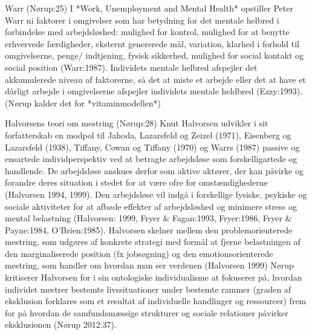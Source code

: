 Warr (Nørup:25)
I *Work, Unemployment and Mental Health* opstiller Peter Warr ni faktorer i omgivelser som har betydning for det mentale helbred i forbindelse med arbejdsløshed: mulighed for kontrol, mulighed for at benytte erhvervede færdigheder, eksternt genererede mål, variation, klarhed i forhold til omgivelserne, penge/ indtjening, fysisk sikkerhed, mulighed for social kontakt og social position (Warr:1987). Individets mentale helbred afspejler det akkumulerede niveau af faktorerne, så det at miste et arbejde eller det at have et dårligt arbejde i omgivelserne afspejler individets mentale heldbred (Ezzy:1993). (Nørup kalder det for *vitaminmodellen*)

Halvorsens teori om mestring (Nørup:28)
Knut Halvorsen udvikler i sit forfatterskab en modpol til Jahoda, Lazarsfeld og Zeizel (1971), Eisenberg og Lazarsfeld (1938), Tiffany, Cowan og Tiffany (1970) og Warrs (1987) passive og ensartede individperspektiv ved at betragte arbejdsløse som forskelligartede og handlende. De arbejdsløse anskues derfor som aktive aktører, der kan påvirke og forandre deres situation i stedet for at være ofre for omstændighederne (Halvorsen 1994, 1999). Den arbejdsløse vil indgå i forskellige fysiske, psykiske og sociale aktiviteter for at afbøde effekter af arbejdsløshed og minimere stress og mental belastning (Halvorsen: 1999, Fryer & Fagan:1993, Fryer:1986, Fryer & Payne:1984, O’Brien:1985). Halvorsen skelner mellem den problemorienterede mestring, som udgøres af konkrete strategi med formål at fjerne belastningen af den marginaliserede position (fx jobsøgning) og den emotionsorienterede mestring, som handler om hvordan man ser verdenen (Halvorsen 1999)
Nørup kritiserer Halvorsen for i sin ontologiske individualisme at fokuserer på, hvordan individet mestrer bestemte livssituationer under bestemte rammer (graden af eksklusion forklares som et resultat af individuelle handlinger og ressourcer) frem for på hvordan de samfundsmæssige strukturer og sociale relationer påvirker eksklusionen (Nørup 2012:37).


